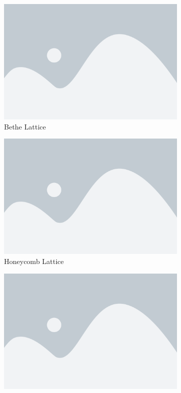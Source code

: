\begin{figure}[p]
  \centering
  \begin{subfigure}[b]{0.45\textwidth}
    \centering
    \includegraphics[width=\textwidth]{placeholder}
    \caption{Bethe Lattice}
    \label{fig:bethe lattice}
  \end{subfigure}
  \hfill
  \begin{subfigure}[b]{0.45\textwidth}
    \centering
    \includegraphics[width=\textwidth]{placeholder}
    \caption{Honeycomb Lattice}
    \label{fig:honeycomb lattice}
  \end{subfigure}
  \hfill
  \begin{subfigure}[b]{0.45\textwidth}
    \centering
    \includegraphics[width=\textwidth]{placeholder}

\end{subfigure}
\end{figure}
